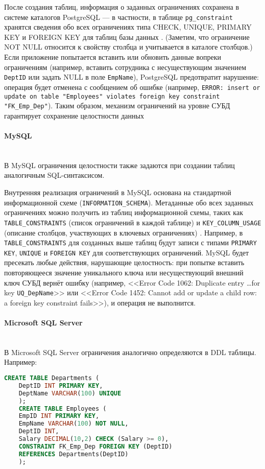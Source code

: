  После создания таблиц, информация о заданных ограничениях сохранена в системе каталогов PostgreSQL — в частности, в таблице \texttt{pg\_constraint} хранятся сведения обо всех ограничениях типа CHECK, UNIQUE, PRIMARY KEY и FOREIGN KEY для таблиц базы данных \autocite{PostgreSQLdocc51}. (Заметим, что ограничение NOT NULL относится к свойству столбца и учитывается в каталоге столбцов.) Если приложение попытается вставить или обновить данные вопреки ограничениям (например, вставить сотрудника с несуществующим значением \texttt{DeptID} или задать NULL в поле \texttt{EmpName}), PostgreSQL предотвратит нарушение: операция будет отменена с сообщением об ошибке (например, \texttt{ERROR: insert or update on table "Employees" violates foreign key constraint "FK\_Emp\_Dep"}). Таким образом, механизм ограничений на уровне СУБД гарантирует сохранение целостности данных

\paragraph{MySQL} ~\\

 В MySQL ограничения целостности также задаются при создании таблиц аналогичным SQL-синтаксисом.

 Внутренняя реализация ограничений в MySQL основана на стандартной информационной схеме (\texttt{INFORMATION\_SCHEMA}). Метаданные обо всех заданных ограничениях можно получить из таблиц информационной схемы, таких как \texttt{TABLE\_CONSTRAINTS} (список ограничений в каждой таблице) и \texttt{KEY\_COLUMN\_USAGE} (описание столбцов, участвующих в ключевых ограничениях) \autocite{Mysqldoc1}. Например, в \texttt{TABLE\_CONSTRAINTS} для созданных выше таблиц будут записи с типами \texttt{PRIMARY KEY}, \texttt{UNIQUE} и \texttt{FOREIGN KEY} для соответствующих ограничений. MySQL будет пресекать любые действия, нарушающие целостность: при попытке вставить повторяющееся значение уникального ключа или несуществующий внешний ключ СУБД вернёт ошибку (например, <<Error Code 1062: Duplicate entry \ldots for key \texttt{UQ\_DepName}>> или <<Error Code 1452: Cannot add or update a child row: a foreign key constraint fails>>), и операция не выполнится. 

\paragraph{Microsoft SQL Server} ~\\ 

 В Microsoft SQL Server ограничения аналогично определяются в DDL таблицы. Например:
 \begin{lstlisting}[language=SQL]
    CREATE TABLE Departments (
    DeptID INT PRIMARY KEY,
    DeptName VARCHAR(100) UNIQUE
    );
    CREATE TABLE Employees (
    EmpID INT PRIMARY KEY,
    EmpName VARCHAR(100) NOT NULL,
    DeptID INT,
    Salary DECIMAL(10,2) CHECK (Salary >= 0),
    CONSTRAINT FK_Emp_Dep FOREIGN KEY (DeptID)
    REFERENCES Departments(DeptID)
    );
 \end{lstlisting}

